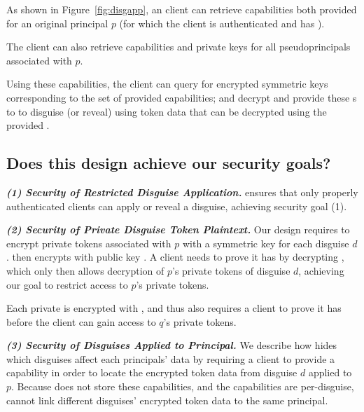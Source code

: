 
As shown in Figure~\ref{fig:disgapp}, an \sys client can retrieve capabilities both provided for an
original principal $p$ (for which the client is authenticated and has ). 

The client can also retrieve capabilities and private keys for all pseudoprincipals associated with $p$.

Using these capabilities, the client can query for encrypted symmetric \symk{} keys corresponding to
the set of provided capabilities; and decrypt and provide these \symk{}s to \sys to disguise (or reveal) using token data that can be decrypted using the provided \symk{}.

\subsection{Does this design achieve our security goals?}
\label{sec:achievegoals}
\vspace{6pt}\noindent\textbf{\emph{(1) Security of Restricted Disguise Application.}}
\sys ensures that only properly authenticated clients can apply or
reveal a disguise, achieving security goal (1).

\vspace{6pt}\noindent\textbf{\emph{(2) Security of Private Disguise Token Plaintext.}}
Our design requires \sys to encrypt private \tdata{} tokens associated with $p$ with a symmetric key
 for each disguise $d$. \sys then encrypts  with public key .  
A client needs to prove it has  by decrypting , which only then allows decryption
of $p$'s private tokens of disguise $d$, achieving our goal to restrict access to $p$'s private
tokens.

Each private  is encrypted with , and thus also requires a client to prove it has
 before the client can gain access to $q$'s private tokens.

\vspace{6pt}\noindent\textbf{\emph{(3) Security of Disguises Applied to Principal.}}
We describe how \sys hides which disguises affect each principals' data by requiring a client to
provide a capability  in order to locate the encrypted token data from disguise $d$ applied
to $p$. Because \sys does not store these capabilities, and the capabilities are per-disguise, \sys
cannot link different disguises' encrypted token data to the same principal.

